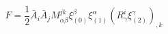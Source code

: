 \begin{equation*}
F=\frac{1}{2}\bar{A}_{i}\bar{A}_{j}M_{\alpha \beta }^{jk}\xi _{(0)}^{\beta
}\xi _{(1)}^{\alpha }(R_{\gamma }^{i}\xi _{(2)}^{\gamma })_{,k}
\end{equation*}

